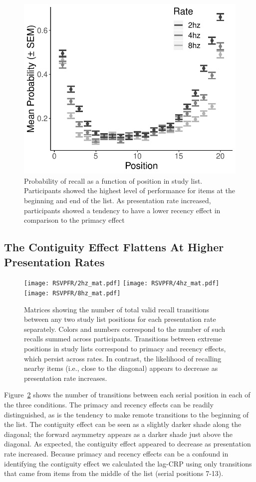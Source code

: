 \documentclass[10pt,letterpaper]{article}
\begin{document}
\begin{figure}
\begin{center}
\includegraphics[width = .4\textwidth]{SPC_adjusted.pdf}
\end{center}
\caption{Probability of recall as a function of position in study list. Participants showed the highest level of performance for items at the beginning and end of the list. As presentation rate increased, participants showed a tendency to have a lower recency effect in comparison to the primacy effect} 
\label{SPC}
\end{figure}

\subsection{The Contiguity Effect Flattens At Higher Presentation Rates}
\begin{figure}
\texttt{[image: RSVPFR/2hz\_mat.pdf]}
\texttt{[image: RSVPFR/4hz\_mat.pdf]}
\texttt{[image: RSVPFR/8hz\_mat.pdf]}
\caption{Matrices showing the number of total valid recall transitions between
any two study list positions for each presentation rate separately. Colors and
numbers correspond to the number of such recalls summed across participants.
Transitions between extreme positions in study lists correspond to primacy and
recency effects, which persist across rates. In contrast, the likelihood of
recalling nearby items (i.e., close to the diagonal) appears to decrease as
presentation rate increases.} \label{uCRP}
\end{figure}

Figure~\ref{uCRP} shows the number of transitions between each serial position
in each of the three conditions.  The 
primacy and recency effects can be readily distinguished, as is the tendency
to make remote transitions to the beginning of the list.
The contiguity effect can be seen as a slightly darker shade along the
diagonal; the forward asymmetry appears as a darker shade just above the
diagonal. As expected, the contiguity effect appeared to decrease as
presentation rate increased.  Because primacy and recency effects can be a
confound in identifying the contiguity effect we calculated the
lag-CRP using only transitions that came from items from the middle of the
list (serial positions 7-13).
\end{document}
